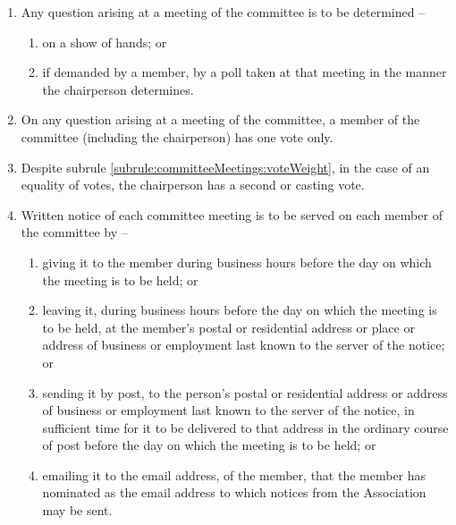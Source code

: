\begin{enumerate}
	\item Any question arising at a meeting of the committee is to be determined --
	\begin{enumerate}
		\item on a show of hands; or
		\item if demanded by a member, by a poll taken at that meeting in the manner the chairperson determines.
	\end{enumerate}
	
	\item \label{subrule:committeeMeetings:voteWeight} On any question arising at a meeting of the committee, a member of the committee (including the chairperson) has one vote only.
	\item Despite subrule \ref{subrule:committeeMeetings:voteWeight}, in the case of an equality of votes, the chairperson has a second or casting vote.

	\item Written notice of each committee meeting is to be served on each member of the committee by --
	\begin{enumerate}
		\item giving it to the member during business hours before the day on which the meeting is to be held; or
		\item leaving it, during business hours before the day on which the meeting is to be held, at the member's postal or residential address or place or address of business or employment last known to the server of the notice; or
		\item sending it by post, to the person's postal or residential address or address of business or employment last known to the server of the notice, in sufficient time for it to be delivered to that address in the ordinary course of post before the day on which the meeting is to be held; or
		\item emailing it to the email address, of the member, that the member has nominated as the email address to which notices from the Association may be sent.
	\end{enumerate}
\end{enumerate}